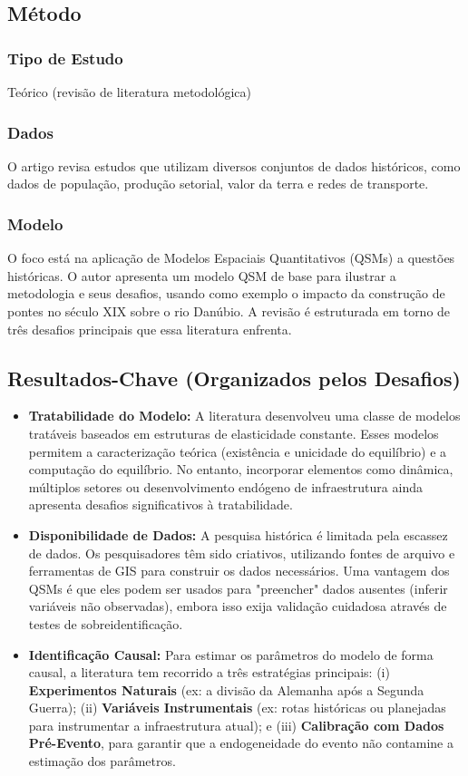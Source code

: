 \documentclass[12pt]{article}
\begin{document}
\subsection*{Método}

\subsubsection*{Tipo de Estudo}
Teórico (revisão de literatura metodológica)

\subsubsection*{Dados}
O artigo revisa estudos que utilizam diversos conjuntos de dados históricos, como dados de população, produção setorial, valor da terra e redes de transporte.

\subsubsection*{Modelo}
O foco está na aplicação de Modelos Espaciais Quantitativos (QSMs) a questões históricas. O autor apresenta um modelo QSM de base para ilustrar a metodologia e seus desafios, usando como exemplo o impacto da construção de pontes no século XIX sobre o rio Danúbio. A revisão é estruturada em torno de três desafios principais que essa literatura enfrenta.

\subsection*{Resultados-Chave (Organizados pelos Desafios)}
\begin{itemize}
    \item \textbf{Tratabilidade do Modelo:} A literatura desenvolveu uma classe de modelos tratáveis baseados em estruturas de elasticidade constante. Esses modelos permitem a caracterização teórica (existência e unicidade do equilíbrio) e a computação do equilíbrio. No entanto, incorporar elementos como dinâmica, múltiplos setores ou desenvolvimento endógeno de infraestrutura ainda apresenta desafios significativos à tratabilidade.
    \item \textbf{Disponibilidade de Dados:} A pesquisa histórica é limitada pela escassez de dados. Os pesquisadores têm sido criativos, utilizando fontes de arquivo e ferramentas de GIS para construir os dados necessários. Uma vantagem dos QSMs é que eles podem ser usados para "preencher" dados ausentes (inferir variáveis não observadas), embora isso exija validação cuidadosa através de testes de sobreidentificação.
    \item \textbf{Identificação Causal:} Para estimar os parâmetros do modelo de forma causal, a literatura tem recorrido a três estratégias principais: (i) \textbf{Experimentos Naturais} (ex: a divisão da Alemanha após a Segunda Guerra); (ii) \textbf{Variáveis Instrumentais} (ex: rotas históricas ou planejadas para instrumentar a infraestrutura atual); e (iii) \textbf{Calibração com Dados Pré-Evento}, para garantir que a endogeneidade do evento não contamine a estimação dos parâmetros.
\end{itemize}
\end{document}
